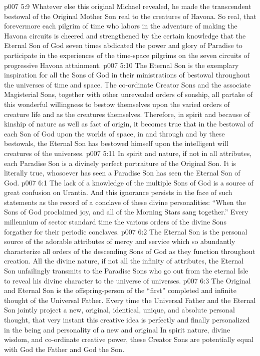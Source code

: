 \vs p007 5:9 Whatever else this original Michael revealed, he made the transcendent bestowal of the Original Mother Son real to the creatures of Havona. So real, that forevermore each pilgrim of time who labors in the adventure of making the Havona circuits is cheered and strengthened by the certain knowledge that the Eternal Son of God seven times abdicated the power and glory of Paradise to participate in the experiences of the time\hyp{}space pilgrims on the seven circuits of progressive Havona attainment.
\vs p007 5:10 \pc The Eternal Son is the exemplary inspiration for all the Sons of God in their ministrations of bestowal throughout the universes of time and space. The co\hyp{}ordinate Creator Sons and the associate Magisterial Sons, together with other unrevealed orders of sonship, all partake of this wonderful willingness to bestow themselves upon the varied orders of creature life and as the creatures themselves. Therefore, in spirit and because of kinship of nature as well as fact of origin, it becomes true that in the bestowal of each Son of God upon the worlds of space, in and through and by these bestowals, the Eternal Son has bestowed himself upon the intelligent will creatures of the universes.
\vs p007 5:11 In spirit and nature, if not in all attributes, each Paradise Son is a divinely perfect portraiture of the Original Son. It is literally true, whosoever has seen a Paradise Son has seen the Eternal Son of God.
\vs p007 6:1 The lack of a knowledge of the multiple Sons of God is a source of great confusion on Urantia. And this ignorance persists in the face of such statements as the record of a conclave of these divine personalities: “When the Sons of God proclaimed joy, and all of the Morning Stars sang together.” Every millennium of sector standard time the various orders of the divine Sons forgather for their periodic conclaves.
\vs p007 6:2 The Eternal Son is the personal source of the adorable attributes of mercy and service which so abundantly characterize all orders of the descending Sons of God as they function throughout creation. All the divine nature, if not all the infinity of attributes, the Eternal Son unfailingly transmits to the Paradise Sons who go out from the eternal Isle to reveal his divine character to the universe of universes.
\vs p007 6:3 \pc The Original and Eternal Son is the offspring\hyp{}person of the “first” completed and infinite thought of the Universal Father. Every time the Universal Father and the Eternal Son jointly project a new, original, identical, unique, and absolute personal thought, that very instant this creative idea is perfectly and finally personalized in the being and personality of a new and original  In spirit nature, divine wisdom, and co\hyp{}ordinate creative power, these Creator Sons are potentially equal with God the Father and God the Son.
